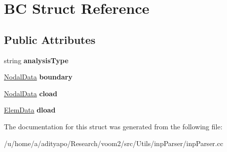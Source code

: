 \hypertarget{struct_b_c}{
\section{BC Struct Reference}
\label{struct_b_c}
}
\subsection*{Public Attributes}
\begin{DoxyCompactItemize}
\item 
\hypertarget{struct_b_c_acbbbb6459947520c51717c07077304a4}{
string {\bfseries analysisType}}
\label{struct_b_c_acbbbb6459947520c51717c07077304a4}

\item 
\hypertarget{struct_b_c_ad64bd2bf5093eff338b11e458d302f50}{
\hyperlink{struct_nodal_data}{NodalData} {\bfseries boundary}}
\label{struct_b_c_ad64bd2bf5093eff338b11e458d302f50}

\item 
\hypertarget{struct_b_c_a8cc98acf91a7d47b4903c5531e52439e}{
\hyperlink{struct_nodal_data}{NodalData} {\bfseries cload}}
\label{struct_b_c_a8cc98acf91a7d47b4903c5531e52439e}

\item 
\hypertarget{struct_b_c_aa24ff506821f8d4fe49ab1d148a88ace}{
\hyperlink{struct_elem_data}{ElemData} {\bfseries dload}}
\label{struct_b_c_aa24ff506821f8d4fe49ab1d148a88ace}

\end{DoxyCompactItemize}


The documentation for this struct was generated from the following file:\begin{DoxyCompactItemize}
\item 
/u/home/a/adityapo/Research/voom2/src/Utils/inpParser/inpParser.cc\end{DoxyCompactItemize}
